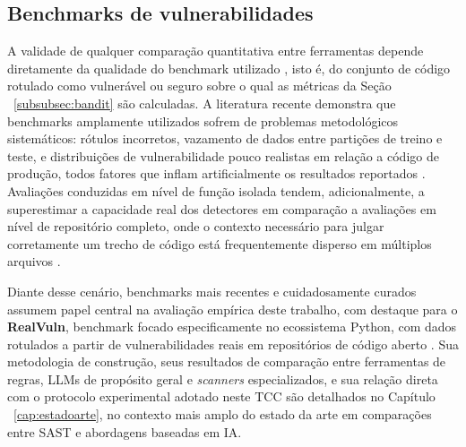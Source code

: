 \subsection{Benchmarks de vulnerabilidades}\label{subsec:benchmarks-vulnerabilidades}
A validade de qualquer comparação quantitativa entre ferramentas depende diretamente da qualidade do benchmark utilizado , isto é, do conjunto de código rotulado como vulnerável ou seguro sobre o qual as métricas da Seção ~\ref{subsubsec:bandit} são calculadas. A literatura recente demonstra que benchmarks amplamente utilizados sofrem de problemas metodológicos sistemáticos: rótulos incorretos, vazamento de dados entre partições de treino e teste, e distribuições de vulnerabilidade pouco realistas em relação a código de produção, todos fatores que inflam artificialmente os resultados reportados \cite{Ding2025CodeLMVuln, Chen2023DiverseVul, Chakraborty2022DLLimits}. Avaliações conduzidas em nível de função isolada tendem, adicionalmente, a superestimar a capacidade real dos detectores em comparação a avaliações em nível de repositório completo, onde o contexto necessário para julgar corretamente um trecho de código está frequentemente disperso em múltiplos arquivos \cite{Wen2026VulEval}.

Diante desse cenário, benchmarks mais recentes e cuidadosamente curados assumem papel central na avaliação empírica deste trabalho, com destaque para o \textbf{RealVuln}, benchmark focado especificamente no ecossistema Python, com dados rotulados a partir de vulnerabilidades reais em repositórios de código aberto \cite{Pellew2026RealVuln}. Sua metodologia de construção, seus resultados de comparação entre ferramentas de regras, LLMs de propósito geral e \textit{scanners} especializados, e sua relação direta com o protocolo experimental adotado neste TCC são detalhados no Capítulo ~\ref{cap:estadoarte}, no contexto mais amplo do estado da arte em comparações entre SAST e abordagens baseadas em IA.
